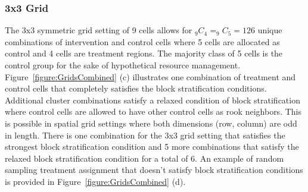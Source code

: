 \documentclass{article}[11pt]
\begin{document}




\subsubsection{3x3 Grid}

The 3x3 symmetric grid setting of 9 cells allows for %
$_{9}C_{4}=_{9}C_{5}=126$ unique combinations of intervention and control cells where 5 cells are allocated as control and 4 cells are treatment regions. The majority class of 5 cells is the control group for the sake of hypothetical resource management. Figure~\ref{figure:GridsCombined} (c) illustrates one combination of treatment and control cells that completely satisfies the block stratification conditions. Additional cluster combinations satisfy a relaxed condition of block stratification where control cells are allowed to have other control cells as rook neighbors. This is possible in spatial grid settings where both dimensions (row, column) are odd in length. There is one combination for the 3x3 grid setting that satisfies the strongest block stratification condition and 5 more combinations that satisfy the relaxed block stratification condition for a total of 6. An example of random sampling treatment assignment that doesn't satisfy block stratification conditions is provided in Figure~\ref{figure:GridsCombined} (d).
\end{document}
